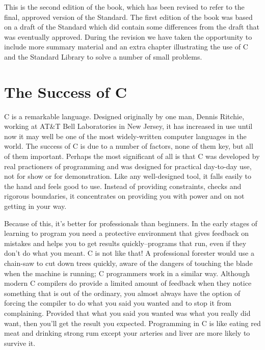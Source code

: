   This is the second edition of the book, which has been revised to refer
   to the final, approved version of the Standard. The first edition of the
   book was based on a draft of the Standard which did contain some
   differences from the draft that was eventually approved. During the
   revision we have taken the opportunity to include more summary material and
   an extra chapter illustrating the use of C and the Standard Library to
   solve a number of small problems.


 
        \section*{The Success of C}
        

  

  C is a remarkable language. Designed originally by one man, Dennis
   Ritchie, working at AT\&T Bell Laboratories in New Jersey, it has
   increased in use until now it may well be one of the most widely-written
   computer languages in the world. The success of C is due to a number of
   factors, none of them key, but all of them important. Perhaps the most
   significant of all is that C was developed by real practioners of
   programming and was designed for practical day-to-day use, not for show or
   for demonstration. Like any well-designed tool, it falls easily to the hand
   and feels good to use. Instead of providing constraints, checks and
   rigorous boundaries, it concentrates on providing you with power and on not
   getting in your way.


  Because of this, it's better for professionals than beginners. In the
   early stages of learning to program you need a protective environment that
   gives feedback on mistakes and helps you to get results
   quickly--programs that run, even if they don't do what you meant.
   C is not like that! A professional forester would use a chain-saw to
   cut down trees quickly, aware of the dangers of touching the blade when the
   machine is running; C programmers work in a similar way. Although
   modern C compilers do provide a limited amount of feedback when they notice
   something that is out of the ordinary, you almost always have the option of
   forcing the compiler to do what you said you wanted and to stop it from
   complaining. Provided that what you said you wanted was what you really did
   want, then you'll get the result you expected. Programming in C is like
   eating red meat and drinking strong rum except your arteries and liver are
   more likely to survive it.


